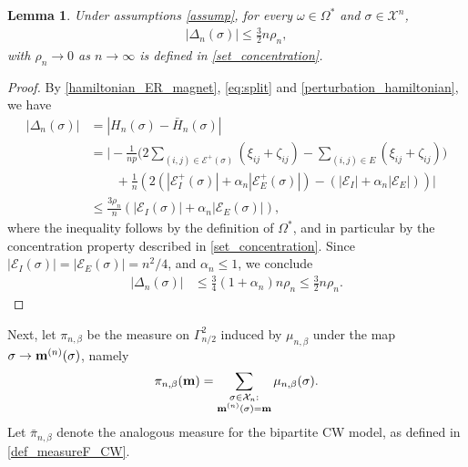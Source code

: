 \documentclass[11pt,oneside]{amsart}
\numberwithin{equation}{section}  %
\theoremstyle{plain}
\newtheorem{lemma}[theorem]{Lemma}
\theoremstyle{remark}
\def \cE {\mathcal{E}}
\def \s {{\sigma}}
\def \bm {{\bf m}}
\begin{document}
\begin{lemma}\label{lem:Delta_n}
Under assumptions \eqref{assump}, for every $\omega \in \Omega^*$ and $\sigma\in \mathcal{X}^n$,
\begin{align*}
    |\Delta_n(\sigma)| \leq \frac 32 n \rho_n,
    \end{align*}
 with $\rho_n \to 0$ as $n \to \infty$ is defined in \eqref{set_concentration}.
\end{lemma}

\begin{proof}

By \eqref{hamiltonian_ER_magnet}, \eqref{eq:split} and \eqref{perturbation_hamiltonian}, we have
\begin{align*}
    |\Delta_n(\sigma)|&=|H_n(\sigma)-\bar{H}_n(\sigma)| \\
    &= 
    \Bigg| -\frac{1}{np}  \bigg (2\sum_{(i, j) \in \cE^{+}(\sigma)}(\xi_{i j}+\zeta_{i j}) 
    - \sum_{(i, j)\in E}(\xi_{i j}+\zeta_{i j}) \bigg) \\
    & \qquad +\frac{1}{n} \left (2\left(|\cE_{I}^{+} (\s)|+\alpha_n |\cE_{E}^{+} (\s)|\right)-\left(|\cE_{I}|+\alpha_n |\cE_{E}|\right)\right ) \Bigg| \\
    &\leq \frac{3\rho_n}{n}(|\cE_{I}(\s)|+ \alpha_n | \cE_{E}(\s) |),
    \end{align*}
where the inequality follows by the definition of $\Omega^*$, and in particular by the concentration  property described 
in \eqref{set_concentration}. Since $|\cE_I(\sigma)|=|\cE_E(\sigma)|= n^2/4$, and $\alpha_n\le 1$, we conclude
\begin{align*}
    |\Delta_n(\sigma)|& \leq \frac{3}{4} (1+\alpha_n)n\rho_n\leq \frac{3}{2}n \rho_n .
\end{align*}
\end{proof}

Next, let $\pi_{n,\beta}$ be the measure on $\Gamma_{n/2}^2$ induced by $\mu_{n,\beta}$ under the map $\sigma \to \bm^{(n)}(\s)$, namely
\begin{align}
\label{FN_ER}
    \pi_{n,\beta} (\bm)=\sum_{\substack{\sigma\in \mathcal{X}_{n}: \\ \bm^{(n)}(\sigma)=\bm}} \mu_{n,\beta}(\sigma).
\end{align}
Let $\bar{\pi}_{n,\beta}$ denote the analogous measure for the bipartite CW model, as defined in \eqref{def_measureF_CW}.
\end{document}
